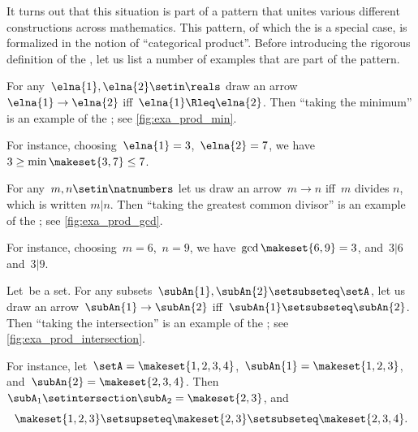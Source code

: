 It turns out that this situation is part of a pattern that unites various different constructions across mathematics.
This pattern, of which the  is a special case, is formalized in the notion of ``categorical product''.
Before introducing the rigorous definition of the , let us list a number of examples that are part of the pattern.

\begin{marginfigure}
    \centering
    \caption{Taking the minimum}
    \label{fig:exa_prod_min}
\end{marginfigure}

\begin{example}
    \label{exa:min-as-prod}
    For any~$\elna{1},\elna{2}\setin \reals$ draw an arrow~$\elna{1}\to \elna{2}$ iff~$\elna{1}\Rleq \elna{2}$.
    Then ``taking the minimum'' is an example of the ; see \cref{fig:exa_prod_min}.

    For instance, choosing~$\elna{1} = 3$,~$\elna{2} = 7$, we have~$3 \geq \min \makeset{3, 7} \leq 7$.
\end{example}

\begin{marginfigure}
    \centering
    \caption{Taking the greatest common divisor}
    \label{fig:exa_prod_gcd}
\end{marginfigure}

\begin{example}
    \label{exa:gcd-as-prod}
    For any~$m, n \setin \natnumbers$ let us draw an arrow~$m \to n$ iff~$m$ divides $n$, which is written $m | n$.
    Then ``taking the greatest common divisor'' is an example of the ; see \cref{fig:exa_prod_gcd}.

    For instance, choosing~$m = 6$,~$n = 9$, we have~$\gcd \makeset{6, 9 } = 3$, and~$3 | 6$ and~$3 | 9$.
\end{example}

\begin{marginfigure}
    \centering
    \caption{Taking the intersection.}
    \label{fig:exa_prod_intersection}
\end{marginfigure}

\begin{example}
    \label{exa:intersection-as-prod}
    Let~\setA be a set.
    For any subsets~$\subAn{1}, \subAn{2} \setsubseteq \setA$, let us draw an arrow~$\subAn{1} \to \subAn{2}$ iff~$\subAn{1} \setsubseteq \subAn{2}$.
    Then ``taking the intersection'' is an example of the ; see \cref{fig:exa_prod_intersection}.

    For instance, let~$\setA = \makeset{ 1, 2, 3, 4 }$,~$\subAn{1} = \makeset{ 1, 2, 3 }$, and~$\subAn{2} = \makeset{2, 3, 4 }$.
    Then~$\subA_1 \setintersection \subA_2 = \makeset{2, 3 }$, and
    \begin{equation}
        \makeset{ 1, 2, 3 } \setsupseteq \makeset{2, 3 } \setsubseteq \makeset{2, 3, 4 }.
    \end{equation}
\end{example}

